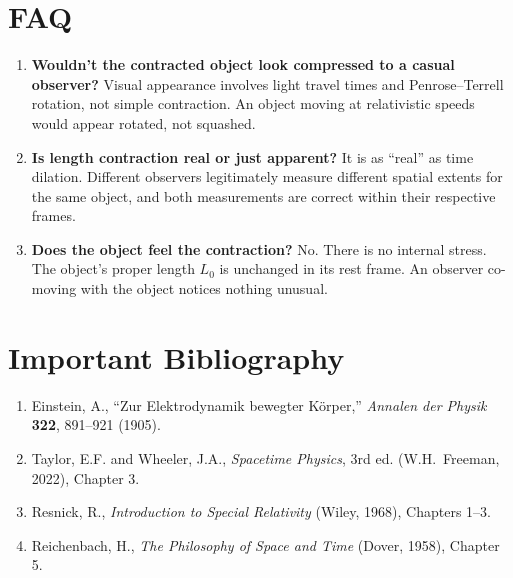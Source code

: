 \section*{FAQ}

\begin{enumerate}
\item \textbf{Wouldn't the contracted object look compressed to a casual observer?}
Visual appearance involves light travel times and Penrose--Terrell rotation, not simple contraction. An object moving at relativistic speeds would appear rotated, not squashed.

\item \textbf{Is length contraction real or just apparent?}
It is as ``real'' as time dilation. Different observers legitimately measure different spatial extents for the same object, and both measurements are correct within their respective frames.

\item \textbf{Does the object feel the contraction?}
No. There is no internal stress. The object's proper length $L_{0}$ is unchanged in its rest frame. An observer co-moving with the object notices nothing unusual.
\end{enumerate}
\section*{Important Bibliography}

\begin{enumerate}
\item Einstein, A., ``Zur Elektrodynamik bewegter K\"orper,'' \textit{Annalen der Physik} \textbf{322}, 891--921 (1905).
\item Taylor, E.F. and Wheeler, J.A., \textit{Spacetime Physics}, 3rd ed. (W.H.\ Freeman, 2022), Chapter 3.
\item Resnick, R., \textit{Introduction to Special Relativity} (Wiley, 1968), Chapters 1--3.
\item Reichenbach, H., \textit{The Philosophy of Space and Time} (Dover, 1958), Chapter 5.
\end{enumerate}

